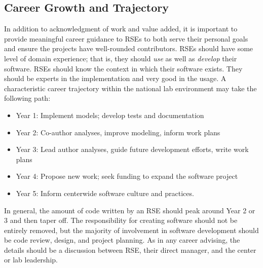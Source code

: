 \documentclass[]{nlr}
\begin{document}
\begin{appendices}
\section{Career Growth and Trajectory}
In addition to acknowledgment of work and value added, it is important to provide meaningful
career guidance to RSEs to both serve their personal goals and ensure the projects have well-rounded contributors. RSEs should have some level of domain
experience; that is, they should \textit{use} as well as \textit{develop} their software.
RSEs should know the context in which their software exists.
They should be experts in the implementation and very good in the usage.
A characteristic career trajectory within the national lab environment may take the following path:

\begin{itemize}
\item Year 1: Implement models; develop tests and documentation
\item Year 2: Co-author analyses, improve modeling, inform work plans
\item Year 3: Lead author analyses, guide future development efforts, write work plans
\item Year 4: Propose new work; seek funding to expand the software project
\item Year 5: Inform centerwide software culture and practices.
\end{itemize}

In general, the amount of code written by an RSE should peak around Year 2 or 3 and
then taper off. The responsibility for creating software should not be entirely removed, but
the majority of involvement in software development should be code review, design, and
project planning. As in any career advising, the details should be a discussion between RSE, their
direct manager, and the center or lab leadership.


\end{appendices}
\end{document}
